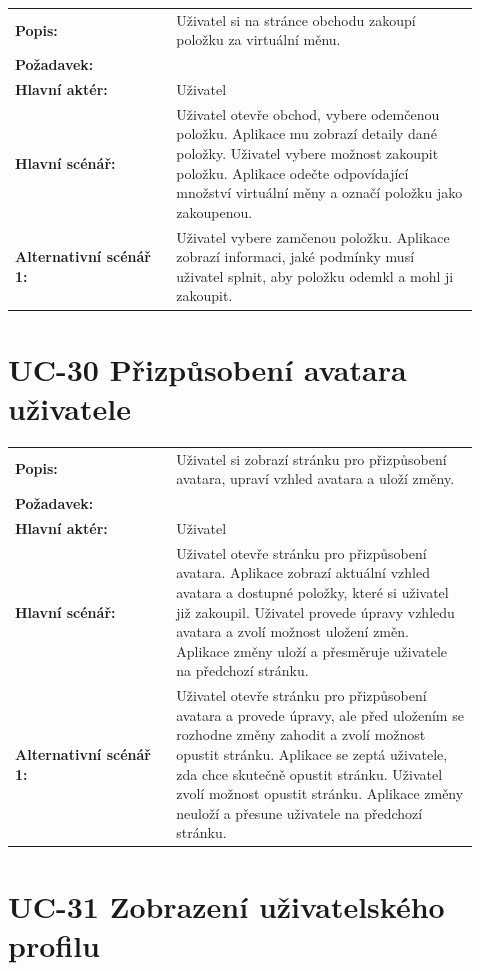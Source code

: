 \begin{tabular}{p{0.32\linewidth}p{0.6\linewidth}}
  \textbf{Popis:} & Uživatel si na stránce obchodu zakoupí položku za virtuální měnu. \\
  \textbf{Požadavek:} & \nameref{sec:fp-shop-unlock-items} \\
  \textbf{Hlavní aktér:} & Uživatel \\
  \textbf{Hlavní scénář:} & Uživatel otevře obchod, vybere odemčenou položku. Aplikace mu zobrazí detaily dané položky. Uživatel vybere možnost zakoupit položku. Aplikace odečte odpovídající množství virtuální měny a označí položku jako zakoupenou. \\
  \textbf{Alternativní scénář 1:} & Uživatel vybere zamčenou položku. Aplikace zobrazí informaci, jaké podmínky musí uživatel splnit, aby položku odemkl a mohl ji zakoupit. \\
\end{tabular}

\section{UC-30 Přizpůsobení avatara uživatele}\label{sec:uc-30}

\begin{tabular}{p{0.32\linewidth}p{0.6\linewidth}}
  \textbf{Popis:} & Uživatel si zobrazí stránku pro přizpůsobení avatara, upraví vzhled avatara a uloží změny. \\
  \textbf{Požadavek:} & \nameref{sec:fp-avatar-customization} \\
  \textbf{Hlavní aktér:} & Uživatel \\
  \textbf{Hlavní scénář:} & Uživatel otevře stránku pro přizpůsobení avatara. Aplikace zobrazí aktuální vzhled avatara a dostupné položky, které si uživatel již zakoupil. Uživatel provede úpravy vzhledu avatara a zvolí možnost uložení změn. Aplikace změny uloží a přesměruje uživatele na předchozí stránku. \\
  \textbf{Alternativní scénář 1:} & Uživatel otevře stránku pro přizpůsobení avatara a provede úpravy, ale před uložením se rozhodne změny zahodit a zvolí možnost opustit stránku. Aplikace se zeptá uživatele, zda chce skutečně opustit stránku. Uživatel zvolí možnost opustit stránku. Aplikace změny neuloží a přesune uživatele na předchozí stránku. \\
\end{tabular}

\section{UC-31 Zobrazení uživatelského profilu}\label{sec:uc-31}

